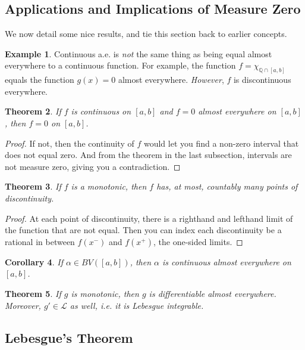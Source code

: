 \documentclass[12pt]{article}
\theoremstyle{plain}
\newtheorem{thm}{Theorem}[subsection]
\newtheorem{cor}[thm]{Corollary}
\theoremstyle{definition}
\newtheorem{ex}[thm]{Example}
\theoremstyle{remark}
\begin{document}
\subsection{Applications and Implications of Measure Zero}

We now detail some nice results, and tie this section back to earlier concepts.

\begin{ex}
Continuous a.e. is \emph{not} the same thing as being equal almost everywhere to a continuous function. For example, the function $f=\chi_{\mathbb{Q} \cap [a,b]}$ equals the function $g(x)=0$ almost everywhere. \emph{However}, $f$ is discontinuous everywhere. 
\end{ex}

\begin{thm}
If $f$ is continuous on $[a,b]$ and $f=0$ almost everywhere on $[a,b]$, then $f=0$ on $[a,b]$.
\end{thm}
\begin{proof}
If not, then the continuity of $f$ would let you find a non-zero interval that does not equal zero. And from the theorem in the last subsection, intervals are not measure zero, giving you a contradiction.
\end{proof}

\begin{thm}
If $f$ is a monotonic, then $f$ has, at most, countably many points of discontinuity.
\end{thm}
\begin{proof}
At each point of discontinuity, there is a righthand and lefthand limit of the function that are not equal. Then you can index each discontinuity be a rational in between $f(x^-)$ and $f(x^+)$, the one-sided limits.
\end{proof}

\begin{cor}
If $\alpha\in BV([a,b])$, then $\alpha$ is continuous almost everywhere on $[a,b]$.
\end{cor}

\begin{thm}
If $g$ is monotonic, then $g$ is differentiable almost everywhere. Moreover, $g'\in\mathscr{L}$ as well, i.e. it is Lebesgue integrable.
\end{thm}

\subsection{Lebesgue's Theorem}
\end{document}
